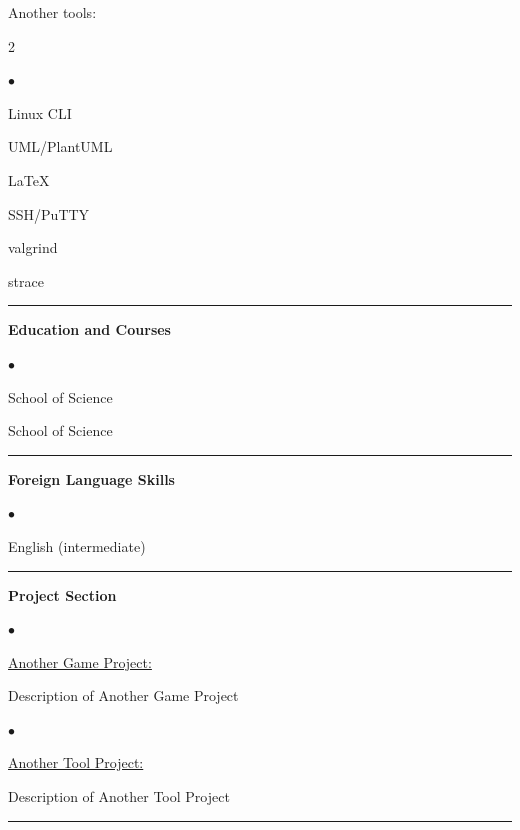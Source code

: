 \documentclass[oneside,final,12pt]{extreport}
\newenvironment{compactlist}{
	\begin{list}{{$\bullet$}}{
		\setlength\leftmargin{0.4cm}
		\setlength\partopsep{0pt}
		\setlength\parskip{0pt}
		\setlength\parsep{0pt}
		\setlength\topsep{0pt}
		\setlength\itemsep{0pt}
	}
}{
	\end{list}
}
\begin{document}
Another tools:
\begin{multicols}{2}
	\begin{compactlist}
		\item Linux CLI
		\item UML/PlantUML
		\item LaTeX
		\item SSH/PuTTY
		\item valgrind 
		\item strace
	\end{compactlist}
\end{multicols}
\rule{\textwidth}{0.4pt}

\bfseries
Education and Courses
\mdseries
\begin{compactlist}
	\item School of Science
	\item School of Science
\end{compactlist}
\rule{\textwidth}{0.4pt}

\bfseries
Foreign Language Skills
\mdseries
\begin{compactlist}
	\item English (intermediate)
\end{compactlist}
\rule{\textwidth}{0.4pt}

\bfseries
Project Section
\mdseries
\begin{compactlist}
	\item \href{https://github.com/@user/another_game_project}{Another Game Project:}
\end{compactlist}
Description of Another Game Project

\begin{compactlist}
	\item \href{https://github.com/@user/another_tool_project}{Another Tool Project:}
\end{compactlist}
Description of Another Tool Project \\
\rule{\textwidth}{0.4pt}
\end{document}
